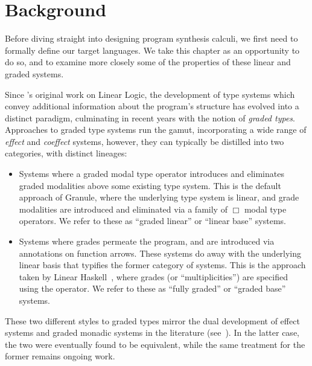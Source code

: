 \chapter{Background}
\label{chapter:background}
Before diving straight into designing program synthesis calculi, we first need
to formally define our target languages. We take
this chapter as an opportunity to do so, and to examine more closely some
of the properties of these linear and graded systems. 

Since \citet{girard1987linear}'s original work on Linear Logic, the development
of type systems which convey additional information about the program's
structure has evolved into a distinct paradigm, culminating in recent years with
the notion of \textit{graded types}. Approaches to graded type systems run the
gamut, incorporating a wide range of \emph{effect} and \emph{coeffect} systems,
however, they can typically be distilled into two categories, with distinct
lineages: 
\begin{itemize}
  \item Systems where a graded modal type operator introduces and eliminates
        graded modalities above some existing type system. This is the default
        approach of Granule, where the underlying type system is linear, and
        grade modalities are introduced and eliminated via a family of $\Box$
        modal type operators. We refer to these as ``graded linear'' or ``linear
        base'' systems.
  \item Systems where grades permeate the program, and are introduced via
        annotations on function arrows. These systems do away with the
        underlying linear basis that typifies the former category of systems.
        This is the approach taken by Linear
        Haskell~\citep{DBLP:journals/pacmpl/BernardyBNJS18}, where grades (or
        ``multiplicities'') are specified using the \granin{\%} operator. We
        refer to these as ``fully graded'' or ``graded base'' systems.
\end{itemize}  
These two different styles to graded types mirror the dual development of effect
systems and graded monadic systems in the literature
(see~\citet{10.1145/601775.601776}). In the latter case, the two were eventually
found to be equivalent, while the same treatment for the former remains ongoing
work. 

